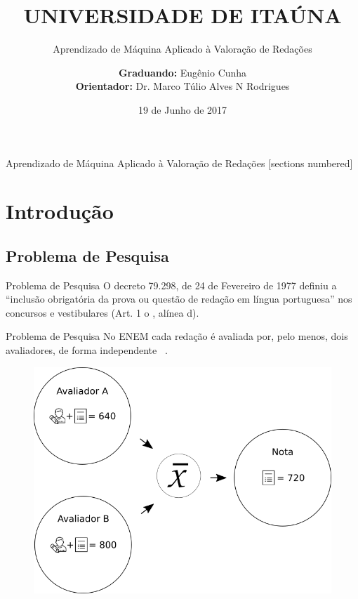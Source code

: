 \documentclass[10pt]{beamer}
\title{UNIVERSIDADE DE ITAÚNA}
\subtitle{Aprendizado de Máquina Aplicado à Valoração de Redações}
\date{19 de Junho de 2017}
\author{\textbf{Graduando:} Eugênio Cunha \\ \textbf{Orientador:} Dr. Marco Túlio Alves N Rodrigues}
\institute{{Departamento de Ciência da Computação \small} \\ {Bacharelado em Ciência da Computação \small}}
\begin{document}
\maketitle

\begin{frame}{Aprendizado de Máquina Aplicado à Valoração de Redações}
  [sections numbered]
  \tableofcontents[subsectionstyle=show]
\end{frame}

\section{Introdução}

  \subsection{Problema de Pesquisa}
    \begin{frame}[fragile]{Problema de Pesquisa}
    O decreto 79.298, de 24 de Fevereiro de 1977 definiu a “inclusão obrigatória da prova ou questão de redação em língua portuguesa” nos concursos e vestibulares (Art. 1 o , alínea d).
    \end{frame}

    \begin{frame}[fragile]{Problema de Pesquisa}
    No ENEM cada redação é avaliada por, pelo menos, dois avaliadores, de forma independente ~\cite{edital_enem:2016}.
    \begin{figure}[H]
    \begin{center}
        \includegraphics[scale=0.50]{images/correction_redaction_enem.png}
    \end{center}
    \end{figure}
    \end{frame}
\end{document}
